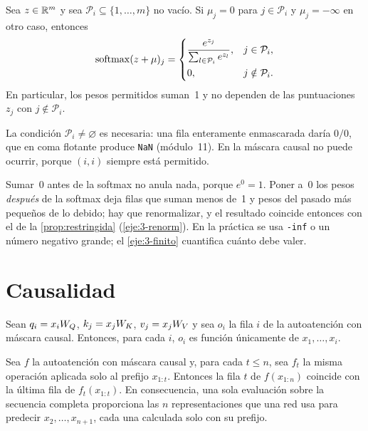 \addtocounter{figure}{1}%

\begin{proposicion}\label{prop:restringida}
Sea $z\in\mathbb{R}^{m}$ y sea $\mathcal{P}_i\subseteq\{1,\dots,m\}$ no vacío. Si $\mu_j=0$ para $j\in\mathcal{P}_i$ y $\mu_j=-\infty$ en otro caso, entonces
\[
\operatorname{softmax}(z+\mu)_j=\begin{cases}\dfrac{e^{z_j}}{\sum_{l\in\mathcal{P}_i}e^{z_l}},& j\in\mathcal{P}_i,\\[2ex] 0,& j\notin\mathcal{P}_i.\end{cases}
\]
En particular, los pesos permitidos suman~1 y no dependen de las puntuaciones $z_j$ con $j\notin\mathcal{P}_i$.
\end{proposicion}

La condición $\mathcal{P}_i\ne\varnothing$ es necesaria: una fila enteramente enmascarada daría $0/0$, que en coma flotante produce \texttt{NaN} (módulo~11). En la máscara causal no puede ocurrir, porque $(i,i)$ siempre está permitido.

\begin{observacion}
Sumar~0 antes de la softmax no anula nada, porque $e^{0}=1$. Poner a~0 los pesos \emph{después} de la softmax deja filas que suman menos de~1 y pesos del pasado más pequeños de lo debido; hay que renormalizar, y el resultado coincide entonces con el de la \cref{prop:restringida} (\cref{eje:3-renorm}). En la práctica se usa \texttt{-inf} o un número negativo grande; el \cref{eje:3-finito} cuantifica cuánto debe valer.
\end{observacion}

\addtocounter{definicion}{1}%

\section{Causalidad}

\begin{teorema}\label{teo:causal}
Sean $q_i=x_iW_{Q}$, $k_j=x_jW_{K}$, $v_j=x_jW_{V}$ y sea $o_i$ la fila $i$ de la autoatención con máscara causal. Entonces, para cada $i$, $o_i$ es función únicamente de $x_1,\dots,x_i$.
\end{teorema}

\begin{corolario}\label{cor:paralelo}
Sea $f$ la autoatención con máscara causal y, para cada $t\le n$, sea $f_t$ la misma operación aplicada solo al prefijo $x_{1:t}$. Entonces la fila $t$ de $f(x_{1:n})$ coincide con la última fila de $f_t(x_{1:t})$. En consecuencia, una sola evaluación sobre la secuencia completa proporciona las $n$ representaciones que una red usa para predecir $x_2,\dots,x_{n+1}$, cada una calculada solo con su prefijo.
\end{corolario}

